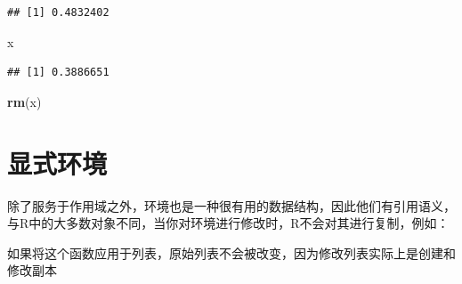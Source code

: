 \documentclass[]{book}
\newenvironment{Shaded}{\begin{snugshade}}{\end{snugshade}}
\newcommand{\KeywordTok}[1]{\textcolor[rgb]{0.13,0.29,0.53}{\textbf{#1}}}
\newcommand{\DecValTok}[1]{\textcolor[rgb]{0.00,0.00,0.81}{#1}}
\newcommand{\StringTok}[1]{\textcolor[rgb]{0.31,0.60,0.02}{#1}}
\newcommand{\ControlFlowTok}[1]{\textcolor[rgb]{0.13,0.29,0.53}{\textbf{#1}}}
\newcommand{\OperatorTok}[1]{\textcolor[rgb]{0.81,0.36,0.00}{\textbf{#1}}}
\newcommand{\NormalTok}[1]{#1}
\begin{document}
\begin{Shaded}
\end{Shaded}

\begin{verbatim}
## [1] 0.4832402
\end{verbatim}

\begin{Shaded}
\begin{Highlighting}[]
\NormalTok{x}
\end{Highlighting}
\end{Shaded}

\begin{verbatim}
## [1] 0.3886651
\end{verbatim}

\begin{Shaded}
\begin{Highlighting}[]
\KeywordTok{rm}\NormalTok{(x)}
\end{Highlighting}
\end{Shaded}

\section{显式环境}

除了服务于作用域之外，环境也是一种很有用的数据结构，因此他们有引用语义，与R中的大多数对象不同，当你对环境进行修改时，R不会对其进行复制，例如：

\begin{Shaded}
\end{Shaded}

如果将这个函数应用于列表，原始列表不会被改变，因为修改列表实际上是创建和修改副本

\begin{Shaded}
\end{Shaded}
\end{document}
